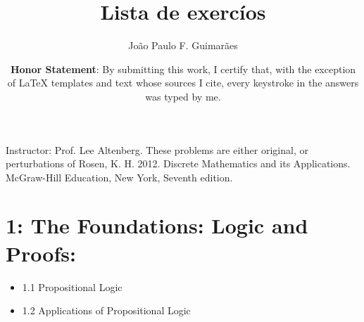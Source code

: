 \documentclass[10pt]{article}
\title {Lista de exercíos}
\author{João Paulo F. Guimarães \\
}
\date{{\bf Honor Statement}:  By submitting this work, I certify that, with the exception of LaTeX templates and text whose sources I cite, every keystroke in the {\color{blue}answers} was typed by me.}
\newcommand{\itemlist}[1]{\begin{itemize}#1\end{itemize}}
\begin{document}
\maketitle
Instructor:  Prof. Lee Altenberg.  These problems are either original, or perturbations of Rosen, K. H. 2012. Discrete Mathematics and its Applications. McGraw-Hill Education, New York, Seventh edition. %

\section{\citet{Rosen:2012:Discrete}1: The Foundations: Logic and Proofs:}
\itemlist{
\item 1.1 Propositional Logic
\item 1.2 Applications of Propositional Logic
}
\end{document}
